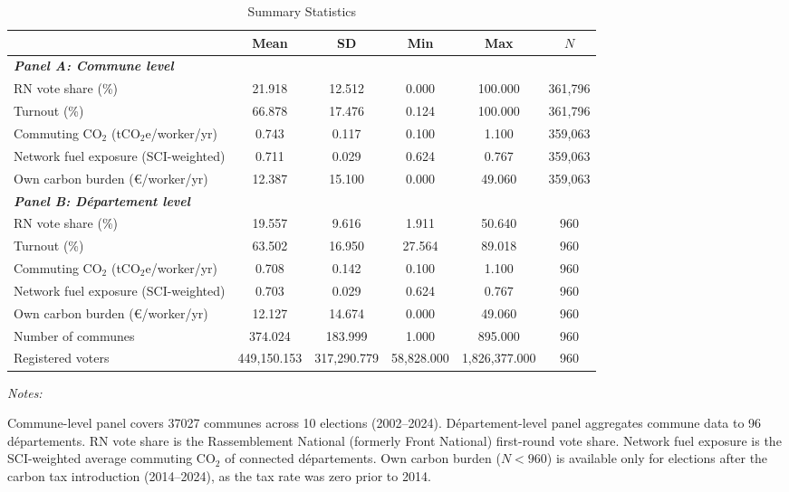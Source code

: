 \begin{table}[!h]
\centering
\caption{Summary Statistics}
\centering
\fontsize{10}{12}\selectfont
\begin{threeparttable}
\begin{tabular}[t]{lccccc}
\toprule
 & Mean & SD & Min & Max & $N$\\
\midrule
\textbf{\textit{Panel A: Commune level}} & \textbf{} & \textbf{} & \textbf{} & \textbf{} & \textbf{}\\
RN vote share (\%) & 21.918 & 12.512 & 0.000 & 100.000 & 361,796\\
Turnout (\%) & 66.878 & 17.476 & 0.124 & 100.000 & 361,796\\
Commuting CO$_2$ (tCO$_2$e/worker/yr) & 0.743 & 0.117 & 0.100 & 1.100 & 359,063\\
Network fuel exposure (SCI-weighted) & 0.711 & 0.029 & 0.624 & 0.767 & 359,063\\
Own carbon burden (\euro/worker/yr) & 12.387 & 15.100 & 0.000 & 49.060 & 359,063\\
\textbf{\textit{Panel B: D\'{e}partement level}} & \textbf{} & \textbf{} & \textbf{} & \textbf{} & \textbf{}\\
RN vote share (\%) & 19.557 & 9.616 & 1.911 & 50.640 & 960\\
Turnout (\%) & 63.502 & 16.950 & 27.564 & 89.018 & 960\\
Commuting CO$_2$ (tCO$_2$e/worker/yr) & 0.708 & 0.142 & 0.100 & 1.100 & 960\\
Network fuel exposure (SCI-weighted) & 0.703 & 0.029 & 0.624 & 0.767 & 960\\
Own carbon burden (\euro/worker/yr) & 12.127 & 14.674 & 0.000 & 49.060 & 960\\
Number of communes & 374.024 & 183.999 & 1.000 & 895.000 & 960\\
Registered voters & 449,150.153 & 317,290.779 & 58,828.000 & 1,826,377.000 & 960\\
\bottomrule
\end{tabular}
\begin{tablenotes}
\item \textit{Notes:} 
\item Commune-level panel covers 37027 communes across 10 elections (2002--2024). D\'{e}partement-level panel aggregates commune data to 96 d\'{e}partements. RN vote share is the Rassemblement National (formerly Front National) first-round vote share. Network fuel exposure is the SCI-weighted average commuting CO$_2$ of connected d\'{e}partements. Own carbon burden ($N < 960$) is available only for elections after the carbon tax introduction (2014--2024), as the tax rate was zero prior to 2014.
\end{tablenotes}
\end{threeparttable}
\end{table}
